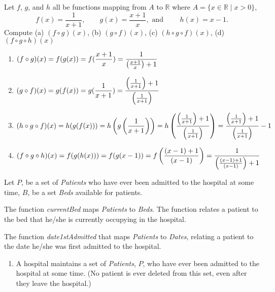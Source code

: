 \begin{questions}
 Let $f$, $g$, and $h$ all be functions mapping from $A$ to $\mathbb{R}$ where $A = \{x \in \mathbb{R} \;|\; x >0 \}$,
$$ f(x) = \frac{1}{x+1}, \qquad g(x) = \frac{x+1}{x}, \text{ and }\qquad h(x) =
x-1. $$
 Compute (a) $(f \circ g)(x)$, (b) $(g \circ f)(x)$, (c) $(h \circ g \circ f)(x)$, (d) $(f \circ g \circ h)(x)$
    \ifprintanswers
        \vspace{-5pt}
   	\fi
	\begin{solution}
	\begin{enumerate}[label=(\alph*),itemsep=3pt,parsep=3pt,topsep=0pt,partopsep=0pt]
	    \item $\displaystyle (f \circ g)(x) = f(g(x)) 
	      = f(\frac{x+1}{x}) 
	      = \frac{1}{\left(\frac{x+1}{x}\right) + 1}$
	    \item $\displaystyle (g \circ f)(x) = g(f(x)) 
	      = g(\frac{1}{x+1}) 
	      = \frac{\left(\frac{1}{x+1}\right)+1}{\left(\frac{1}{x+1}\right)}$
	    \item $\displaystyle (h \circ g \circ f)(x) = h(g(f(x)))
	      = h\left( g\left(\frac{1}{x+1} \right) \right)
	      = h\left( \frac{\left(\frac{1}{x+1}\right)+1}{\left(\frac{1}{x+1}\right)} \right)
	      = \frac{\left(\frac{1}{x+1}\right)+1}{\left(\frac{1}{x+1}\right)} - 1$
	    \item $\displaystyle (f \circ g \circ h)(x) = f(g(h(x))) 
	      = f(g(x-1)) 
	      = f\left(\frac{(x-1) +1}{(x-1)}\right) 
	      = \frac{1}{\left(\frac{(x-1) +1}{(x-1)}\right) + 1}$
	\end{enumerate}
	\end{solution}



	\ifprintanswers
		Let $P$, be a set of \textit{Patients} who have ever been admitted to the hospital at some time, $B$, be a set \textit{Beds} available for patients. 

		The function \textit{currentBed} maps \textit{Patients} to \textit{Beds}. The function relates a patient to the bed that he/she is currently occupying in the hospital. 

		The function \textit{date1stAdmitted} that maps \textit{Patients} to \textit{Dates}, relating a patient to the date he/she was first admitted to the hospital.
        \vspace{-5pt}
   	\else
\begin{enumerate}[label=(\alph*),itemsep=0pt,parsep=3pt,topsep=0pt,partopsep=0pt]
	\item A hospital maintains a set of \textit{Patients}, $P$, who have ever been admitted to the hospital at some time. (No patient is ever deleted from this set, even after they leave the hospital.) 


\end{enumerate}
\end{questions}
